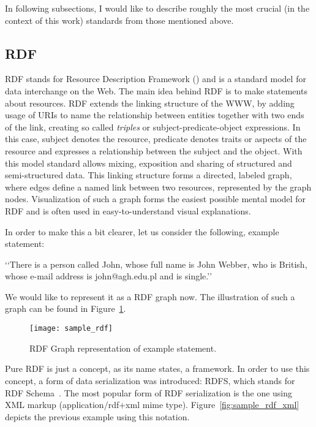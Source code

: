 In following subsections, I would like to describe roughly the most crucial (in the context of this work) standards from those mentioned above.

\subsection{RDF}

RDF stands for Resource Description Framework (\cite{rdfPrimer:2004}) and is a standard model for data interchange on the Web. The main idea behind RDF is to make statements about resources. RDF extends the linking structure of the WWW, by adding usage of URIs to name the relationship between entities together with two ends of the link, creating so called \emph{triples} or subject-predicate-object expressions. In this case, subject denotes the resource, predicate denotes traits or aspects of the resource and expresses a relationship between the subject and the object. With this model standard allows mixing, exposition and sharing of structured and semi-structured data. This linking structure forms a directed, labeled graph, where edges define a named link between two resources, represented by the graph nodes. Visualization of such a graph forms the easiest possible mental model for RDF and is often used in easy-to-understand visual explanations.

In order to make this a bit clearer, let us consider the following, example statement:

\lq\lq{}There is a person called John, whose full name is John Webber, who is British, whose e-mail address is john@agh.edu.pl and is single.\rq\rq{}

We would like to represent it as a RDF graph now. The illustration of such a graph can be found in Figure~\ref{fig:sample_rdf}.

\begin{figure}[ht]
	\centering
	\texttt{[image: sample\_rdf]}
	\caption{RDF Graph representation of example statement.}
	\label{fig:sample_rdf}
\end{figure}

Pure RDF is just a concept, as its name states, a framework. In order to use this concept, a form of data serialization was introduced: RDFS, which stands for RDF Schema~\cite{rdfRef:2004}. The most popular form of RDF serialization is the one using XML markup (application/rdf+xml mime type). Figure~\ref{fig:sample_rdf_xml} depicts the previous example using this notation.

